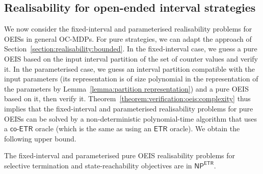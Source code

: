 \documentclass[a4paper,UKenglish,cleveref,autoref,thm-restate,colorlinks]{lipics-v2021}
\newcommand{\np}{\textsf{NP}}
\newcommand{\etr}{\textsf{ETR}}
\newcommand{\coetr}{\textsf{co-ETR}}
\begin{document}
\subsection{Realisability for open-ended interval strategies}\label{section:realisability:oeis}

We now consider the fixed-interval and parameterised realisability problems for OEISs in general OC-MDPs.
For pure strategies, we can adapt the approach of Section~\ref{section:realisability:bounded}.
In the fixed-interval case, we guess a pure OEIS based on the input interval partition of the set of counter values and verify it.
In the parameterised case, we guess an interval partition compatible with the input parameters (its representation is of size polynomial in the representation of the parameters by Lemma~\ref{lemma:partition representation}) and a pure OEIS based on it, then verify it.
Theorem~\ref{theorem:verification:oeis:complexity} thus implies that the fixed-interval and parameterised realisability problems for pure OEISs can be solved by a non-deterministic polynomial-time algorithm that uses a $\coetr$ oracle (which is the same as using an $\etr$ oracle).
We obtain the following upper bound.
\begin{theorem}\label{theorem:realisability:oeis:pure}
  The fixed-interval and parameterised pure OEIS realisability problems for selective termination and state-reachability objectives are in $\np^\etr$.
\end{theorem}
\end{document}
